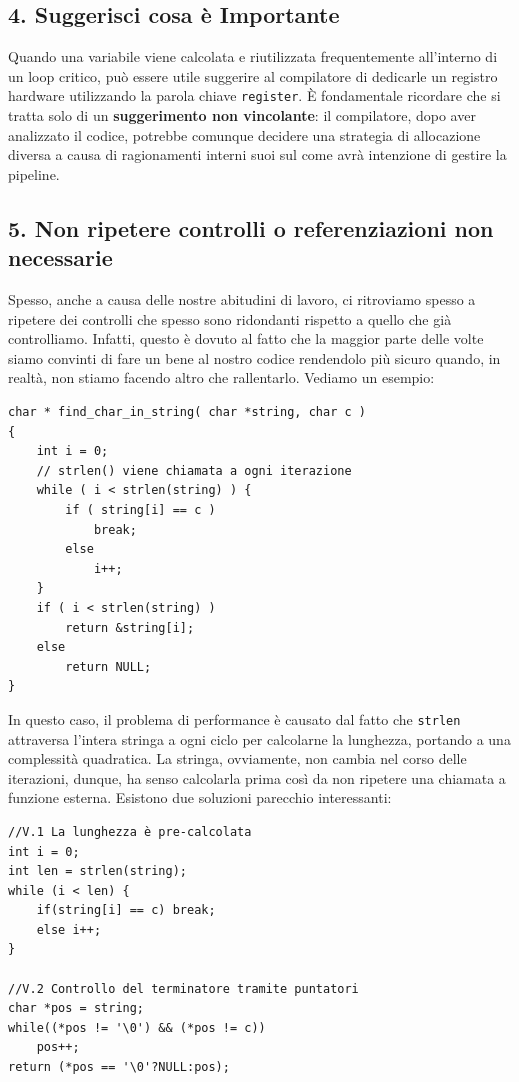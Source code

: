 \subsection{4. Suggerisci cosa è Importante}
Quando una variabile viene calcolata e riutilizzata frequentemente all'interno di un loop critico, può essere utile suggerire al compilatore di dedicarle un registro hardware utilizzando la parola chiave \texttt{register}. È fondamentale ricordare che si tratta solo di un \textbf{suggerimento non vincolante}: il compilatore, dopo aver analizzato il codice, potrebbe comunque decidere una strategia di allocazione diversa a causa di ragionamenti interni suoi sul come avrà intenzione di gestire la pipeline.
\subsection{5. Non ripetere controlli o referenziazioni non necessarie}
Spesso, anche a causa delle nostre abitudini di lavoro, ci ritroviamo spesso a ripetere dei controlli che spesso sono ridondanti rispetto a quello che già controlliamo. Infatti, questo è dovuto al fatto che la maggior parte delle volte siamo convinti di fare un bene al nostro codice rendendolo più sicuro quando, in realtà, non stiamo facendo altro che rallentarlo. Vediamo un esempio:
\begin{framed}
\noindent
\footnotesize
\begin{verbatim}
char * find_char_in_string( char *string, char c )
{
    int i = 0;
    // strlen() viene chiamata a ogni iterazione
    while ( i < strlen(string) ) {
        if ( string[i] == c )
            break;
        else
            i++;
    }
    if ( i < strlen(string) )
        return &string[i];
    else
        return NULL;
}
\end{verbatim}
\end{framed}
In questo caso, il problema di performance è causato dal fatto che \texttt{strlen} attraversa l'intera stringa a ogni ciclo per calcolarne la lunghezza, portando a una complessità quadratica. La stringa, ovviamente, non cambia nel corso delle iterazioni, dunque, ha senso calcolarla prima così da non ripetere una chiamata a funzione esterna.
Esistono due soluzioni parecchio interessanti:
\begin{framed}
\footnotesize
\begin{verbatim}
//V.1 La lunghezza è pre-calcolata 
int i = 0;
int len = strlen(string);
while (i < len) {
    if(string[i] == c) break;
    else i++;
}

//V.2 Controllo del terminatore tramite puntatori 
char *pos = string;
while((*pos != '\0') && (*pos != c)) 
    pos++;
return (*pos == '\0'?NULL:pos);
\end{verbatim}
\end{framed}
